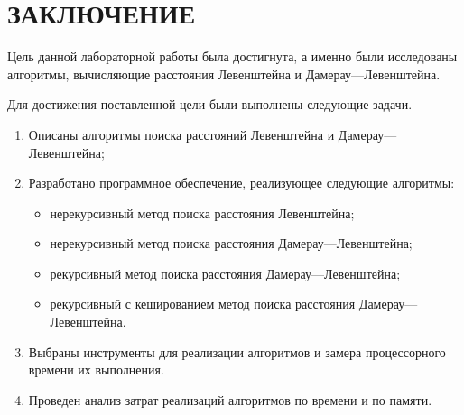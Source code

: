 \chapter*{ЗАКЛЮЧЕНИЕ}

Цель данной лабораторной работы была достигнута, а именно были исследованы алгоритмы, вычисляющие расстояния Левенштейна и Дамерау---Левенштейна.

Для достижения поставленной цели были выполнены следующие задачи.
\begin{enumerate}
	\item Описаны алгоритмы поиска расстояний Левенштейна и \newline Дамерау---Левенштейна;
	\item Разработано программное обеспечение, реализующее следующие алгоритмы:
	\begin{itemize}
		\item нерекурсивный метод поиска расстояния Левенштейна;
		\item нерекурсивный метод поиска расстояния Дамерау---Левенштейна;
		\item рекурсивный метод поиска расстояния Дамерау---Левенштейна;
		\item рекурсивный с кешированием метод поиска расстояния Дамерау---Левенштейна.
	\end{itemize}
	\item Выбраны инструменты для реализации алгоритмов и замера процессорного времени их выполнения.
	\item Проведен анализ затрат реализаций алгоритмов по времени и по памяти. 
\end{enumerate}